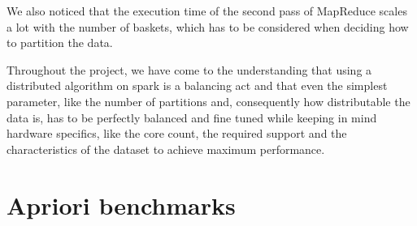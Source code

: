 \documentclass[a4paper]{article}
\begin{document}
	We also noticed that the execution time of the second pass of MapReduce scales a lot with the number of baskets, which has to be considered when deciding how to partition the data.

	Throughout the project, we have come to the understanding that using a distributed algorithm on spark is a balancing act and that even the simplest parameter, like the number of partitions and, consequently how distributable 
	the data is, has to be perfectly balanced and fine tuned while keeping in mind hardware specifics, like the core count, the required support and the characteristics of the dataset to achieve 
	maximum performance.
	

	\newpage
	\appendix 

	\section{Apriori benchmarks}
\end{document}
